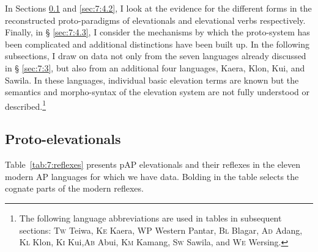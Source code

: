 In Sections \ref{sec:7:4.1} and \ref{sec:7:4.2}, I look at the evidence for the different forms in the reconstructed proto-paradigms of elevationals  and elevational verbs respectively. Finally, in {\S} \ref{sec:7:4.3}, I consider the mechanisms by which the proto-system has been complicated and additional distinctions have been built up. In the following subsections, I draw on data not only from the seven languages already discussed in {\S} \ref{sec:7:3}, but also from an additional four languages, Kaera, Klon, Kui, and Sawila. In these languages, individual basic elevation terms are known but the semantics and morpho-syntax of the elevation system are not fully understood or described.\footnote{The following language abbreviations are used in tables in subsequent sections: \textsc{Tw} Teiwa, \textsc{Ke} Kaera, \textsc{WP} Western Pantar, \textsc{Bl} Blagar, \textsc{Ad} Adang, \textsc{Kl} Klon, \textsc{Ki} Kui,\textsc{Ab}  Abui, \textsc{Km} Kamang, \textsc{Sw} Sawila, and \textsc{We} Wersing.} 

\subsection{Proto-elevationals}\label{sec:7:4.1}
Table~\ref{tab:7:reflexes} presents pAP elevationals and their reflexes in the eleven modern AP languages for which we have data. Bolding in the table selects the cognate parts of the modern reflexes.

\enlargethispage{-3em}
 


